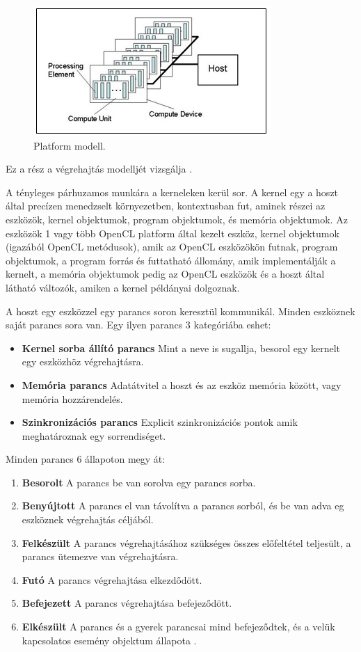 \begin{figure}[h]
\centering
\includegraphics[scale=1.0]{images/platform_modell.jpg}
\caption{Platform modell. \cite{spec_platform}}
\label{fig:platform_modell}
\end{figure}

Ez a rész a végrehajtás modelljét vizsgálja \cite{spec_exec}.

A tényleges párhuzamos munkára a kerneleken kerül sor. A kernel egy a hoszt által precízen menedzselt környezetben, kontextusban fut, aminek részei az eszközök, kernel objektumok, program objektumok, és memória objektumok. Az eszközök 1 vagy több OpenCL platform által kezelt eszköz, kernel objektumok (igazából OpenCL metódusok), amik az OpenCL eszközökön futnak, program objektumok, a program forrás és futtatható állomány, amik implementálják a kernelt, a memória objektumok pedig az OpenCL eszközök és a hoszt által látható változók, amiken a kernel példányai dolgoznak.

A hoszt egy eszközzel egy parancs soron keresztül kommunikál. Minden eszköznek saját parancs sora van. Egy ilyen parancs 3 kategóriába eshet:
\begin{itemize}
\item\textbf{Kernel sorba állító parancs} Mint a neve is sugallja, besorol egy kernelt egy eszközhöz végrehajtásra.
\item\textbf{Memória parancs} Adatátvitel a hoszt és az eszköz memória között, vagy memória hozzárendelés.
\item\textbf{Szinkronizációs parancs} Explicit szinkronizációs pontok amik meghatároznak egy sorrendiséget.
\end{itemize}
Minden parancs 6 állapoton megy át:
\begin{enumerate}
\item\textbf{Besorolt} A parancs be van sorolva egy parancs sorba.
\item\textbf{Benyújtott} A parancs el van távolítva a parancs sorból, és be van adva eg eszköznek végrehajtás céljából.
\item\textbf{Felkészült} A parancs végrehajtásához szükséges összes előfeltétel teljesült, a parancs ütemezve van végrehajtásra.
\item\textbf{Futó} A parancs végrehajtása elkezdődött.
\item\textbf{Befejezett} A parancs végrehajtása befejeződött.
\item\textbf{Elkészült} A parancs és a gyerek parancsai mind befejeződtek, és a velük kapcsolatos esemény objektum állapota .
\end{enumerate}


